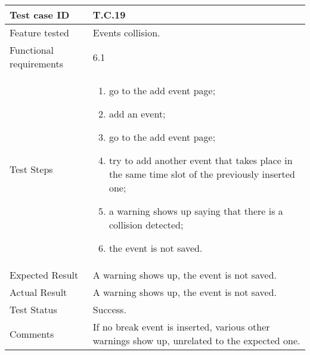 \begin{table}[H]
	\begin{center}
		\begin{tabular}{ | p{} | p{} | }
		\hline
		Test case ID & T.C.19\\
		\hline
		Feature tested & Events collision.\\
    	\hline
		Functional requirements & 6.1  \\
		\hline
		Test Steps & 
			\begin{enumerate}
				\item go to the add event page;
				\item add an event;
				\item go to the add event page;
				\item try to add another event that takes place in the same time slot of the previously inserted one;
				\item a warning shows up saying that there is a collision detected;
				\item the event is not saved.
			\end{enumerate} \\
		\hline
		Expected Result & A warning shows up, the event is not saved.\\
		\hline
		Actual Result & A warning shows up, the event is not saved.\\ 
		\hline
		Test Status & \color{ForestGreen}Success.\\ 
		\hline
		Comments & If no break event is inserted, various other warnings show up, unrelated to the expected one. \\
		\hline
		
		\end{tabular}
	\end{center}
\end{table}

